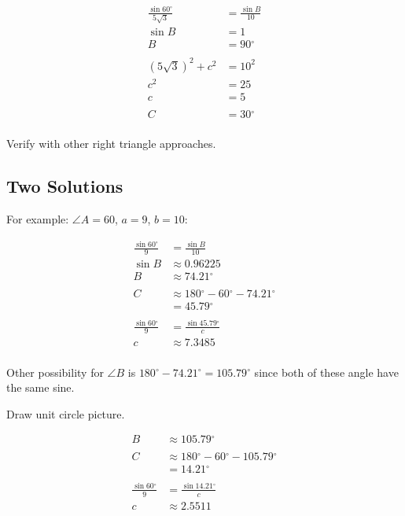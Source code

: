 \documentclass{exam}
\newcommand{\dg}{\ensuremath{^\circ}}
\begin{document}
  \begin{align*}
    \frac{\sin 60 \dg}{5 \sqrt{3}} & = \frac{\sin B}{10} \\
    \sin B                         & = 1 \\
    B                              & = 90 \dg \\
    \\
    (5 \sqrt{3})^2 + c^2           & = 10^2 \\
    c^2                            & = 25 \\
    c                              & = 5 \\
    \\
    C                              & = 30 \dg \\
  \end{align*}

  Verify with other right triangle approaches.

  \subsection{Two Solutions}
  For example: $\angle A = 60$, $a = 9$, $b = 10$:

  \begin{align*}
    \frac{\sin 60 \dg}{9} & = \frac{\sin B}{10} \\
    \sin B                & \approx 0.96225\\
    B                     & \approx 74.21 \dg \\
    \\
    C                     & \approx 180 \dg - 60 \dg - 74.21 \dg \\
                          & = 45.79 \dg \\
    \\
    \frac{\sin 60 \dg}{9} & = \frac{\sin 45.79 \dg}{c} \\
    c                     & \approx 7.3485 \\
  \end{align*}

  Other possibility for $\angle B$ is $180 \dg - 74.21 \dg = 105.79 \dg$ since both of these angle have the same sine.

  Draw unit circle picture.

  \begin{align*}
    B                     & \approx 105.79 \dg \\
    \\
    C                     & \approx 180 \dg - 60 \dg - 105.79 \dg \\
                          & = 14.21 \dg \\
    \\
    \frac{\sin 60 \dg}{9} & = \frac{\sin 14.21 \dg}{c} \\
    c                     & \approx 2.5511 \\
  \end{align*}
\end{document}
